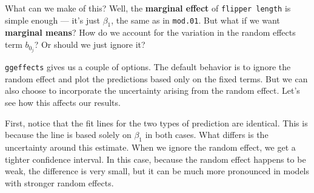 \documentclass[
]{article}
\newenvironment{Shaded}{\begin{snugshade}}{\end{snugshade}}
\newcommand{\AttributeTok}[1]{\textcolor[rgb]{0.13,0.29,0.53}{#1}}
\newcommand{\CommentTok}[1]{\textcolor[rgb]{0.56,0.35,0.01}{\textit{#1}}}
\newcommand{\FloatTok}[1]{\textcolor[rgb]{0.00,0.00,0.81}{#1}}
\newcommand{\FunctionTok}[1]{\textcolor[rgb]{0.13,0.29,0.53}{\textbf{#1}}}
\newcommand{\NormalTok}[1]{#1}
\newcommand{\OtherTok}[1]{\textcolor[rgb]{0.56,0.35,0.01}{#1}}
\newcommand{\SpecialCharTok}[1]{\textcolor[rgb]{0.81,0.36,0.00}{\textbf{#1}}}
\newcommand{\StringTok}[1]{\textcolor[rgb]{0.31,0.60,0.02}{#1}}
\begin{document}
What can we make of this? Well, the \textbf{marginal effect} of
\texttt{flipper\ length} is simple enough --- it's just \(\beta_1\), the
same as in \texttt{mod.01}. But what if we want \textbf{marginal means}?
How do we account for the variation in the random effects term
\(b_{0_j}\)? Or should we just ignore it?

\texttt{ggeffects} gives us a couple of options. The default behavior is
to ignore the random effect and plot the predictions based only on the
fixed terms. But we can also choose to incorporate the uncertainty
arising from the random effect. Let's see how this affects our results.

\begin{Shaded}
\end{Shaded}

First, notice that the fit lines for the two types of prediction are
identical. This is because the line is based solely on \(\beta_1\) in
both cases. What differs is the uncertainty around this estimate. When
we ignore the random effect, we get a tighter confidence interval. In
this case, because the random effect happens to be weak, the difference
is very small, but it can be much more pronounced in models with
stronger random effects.
\end{document}
